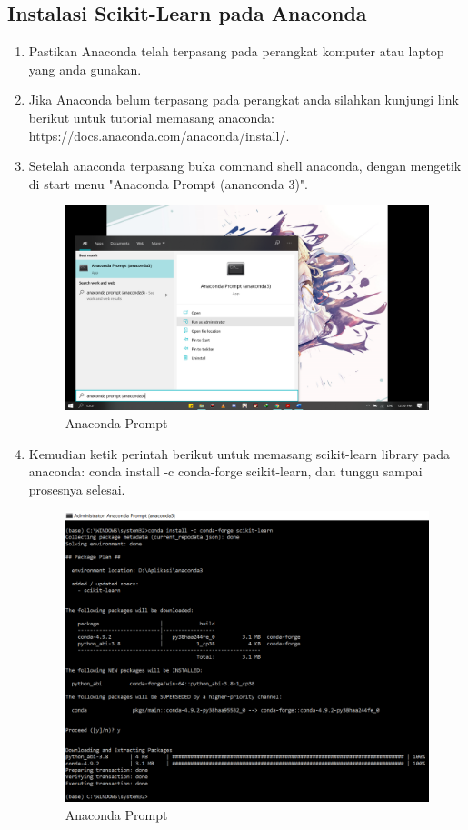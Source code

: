 \subsection{Instalasi Scikit-Learn pada Anaconda}

\begin{enumerate}
    \item Pastikan Anaconda telah terpasang pada perangkat komputer atau laptop yang anda gunakan.
    \item Jika Anaconda belum terpasang pada perangkat anda silahkan kunjungi link berikut untuk tutorial memasang anaconda: https://docs.anaconda.com/anaconda/install/.
    \item Setelah anaconda terpasang buka command shell anaconda, dengan mengetik di start menu "Anaconda Prompt (ananconda 3)".
        \begin{figure}[H]
        \centering
        \includegraphics[width=11cm]{figures/1184023/install.png}
        \caption{Anaconda Prompt}
        \end{figure}
    \item Kemudian ketik perintah berikut untuk memasang scikit-learn library pada anaconda: conda install -c conda-forge scikit-learn, dan tunggu sampai prosesnya selesai.
        \begin{figure}[H]
        \centering
        \includegraphics[width=13cm]{figures/1184023/1.PNG}
        \caption{Anaconda Prompt}
        \end{figure}
\end{enumerate}

